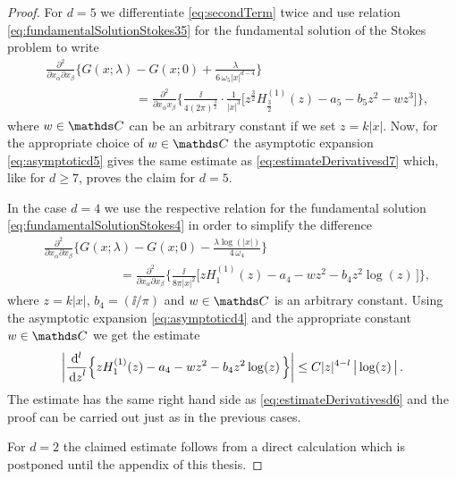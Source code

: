 \begin{proof}
For $d = 5$ we differentiate \eqref{eq:secondTerm} twice and use relation \eqref{eq:fundamentalSolutionStokes35} for the fundamental solution of the Stokes problem to  write
\begin{align*}
  &\frac{\partial^2}{\partial x_\alpha \partial x_\beta} \bigg\{ G(x; \lambda) - G(x; 0) + \frac{\lambda}{6\, \omega_5 |x|^{d - 4}} \bigg\} \\
  &\hspace{3cm}= \frac{\partial^2}{\partial x_\alpha x_\beta} \bigg\{ \frac{\ii}{4(2\pi)^{\frac{3}{2}}} \cdot \frac{1}{|x|^3} \Big[ z^{\frac{3}{2}} H_{\frac{3}{2}}^{(1)}(z) - a_5 - b_5 z^2 - w z^3 \Big] \bigg\},
\end{align*}
where $w\in\C$ can be an arbitrary constant if we set $z = k|x|$.
Now, for the appropriate choice of $w \in \C$ the asymptotic expansion \eqref{eq:asymptoticd5} gives the same estimate as \eqref{eq:estimateDerivativesd7} which, like for $d \geq 7$, proves the claim for $d = 5$.

In the case $d = 4$ we use the respective relation for the fundamental solution \eqref{eq:fundamentalSolutionStokes4} in order to simplify the difference
\begin{align*}
  & \frac{\partial^2}{\partial x_\alpha \partial x_\beta} \bigg\{ G(x; \lambda) - G(x; 0) - \frac{\lambda \log(|x|)}{4\, \omega_4} \bigg\} \\
  &\qquad\qquad\qquad= \frac{\partial^2}{\partial x_\alpha \partial x_\beta} \bigg\{ \frac{\ii}{8 \pi |x|^2} \Big[ z H_1^{(1)}(z) - a_4 - w z^2 - b_4 z^2 \log(z)\,\Big] \bigg\},
\end{align*}
where $z = k |x|$, $b_4 = ({\ii}/{\pi})$ and $w \in \C$ is an arbitrary constant. Using the asymptotic expansion \eqref{eq:asymptoticd4} and the appropriate constant $w \in \C$ we get the estimate
\begin{align*}
  \bigg| \frac{\mathrm{d}^l}{\, {\operatorname{d}\!{z}}^l} \Big\{ z H_1^{(1)}(z) - a_4 - w z^2 - b_4 z^2 \log(z)\, \Big\} \bigg| \leq C |z|^{4 - l}\, \big|\log(z)\,\big|\,.
\end{align*}
The estimate has the same right hand side as \eqref{eq:estimateDerivativesd6} and the proof can be carried out just as in the previous cases.

For $d = 2$ the claimed estimate follows from a direct calculation which is postponed until the appendix of this thesis.
\end{proof}

